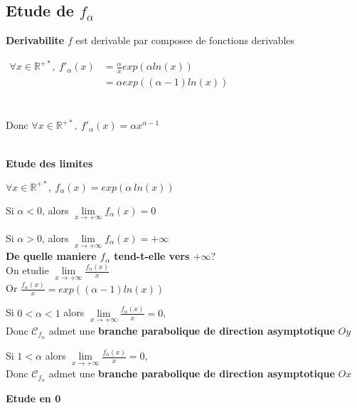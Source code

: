 \documentclass[12pt,twoside,a4paper]{article}
\begin{document}
		\subsection{Etude de $f_\alpha$}
			\textbf{Derivabilite} $f$ est derivable par composee de fonctions derivables
				\begin{tab}
					$\begin{aligned}\forall x\in\mathbb{R}^{+*},\ f'_\alpha(x)&=\frac{\alpha}{x}exp(\alpha ln(x))\\
						&=\alpha exp((\alpha-1)ln(x))\end{aligned}$\\\\\\
						Donc $\forall x\in\mathbb{R}^{+*},\ f'_\alpha(x)=\alpha x^{\alpha-1}$
				\end{tab}\ \\
			\textbf{Etude des limites}
				\begin{tab}
					$\forall x\in\mathbb{R}^{+*},\ f_\alpha(x)=exp(\alpha\ ln(x))$
					\begin{liste}
						\item Si $\alpha<0$, alors $\lim\limits_{x\rightarrow+\infty}f_\alpha(x)=0$
						\item Si $\alpha>0$, alors $\lim\limits_{x\rightarrow+\infty}f_\alpha(x)=+\infty$\\
							\textbf{De quelle maniere $f_\alpha$ tend-t-elle vers $+\infty?$}\\
								On etudie $\lim\limits_{x\rightarrow+\infty}\frac{f_\alpha(x)}{x}$\\
								Or $\frac{f_\alpha(x)}{x}=exp((\alpha-1)ln(x))$
								\begin{liste}
									\item Si $0<\alpha<1$ alors $\lim\limits_{x\rightarrow+\infty}\frac{f_\alpha(x)}{x}=0$,\\
											Donc $\mathscr{C}_{f_\alpha}$ admet une \textbf{branche parabolique de direction asymptotique} $Oy$
									\item Si $1<\alpha$ alors $\lim\limits_{x\rightarrow+\infty}\frac{f_\alpha(x)}{x}=0$,\\
										Donc $\mathscr{C}_{f_\alpha}$ admet une \textbf{branche parabolique de direction asymptotique} $Ox$
								\end{liste}
					\end{liste}
				\end{tab}\pagebreak
			\textbf{Etude en 0}
\end{document}

